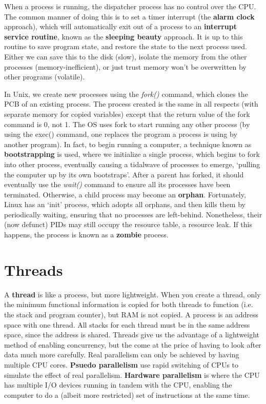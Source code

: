 When a process is running, the dispatcher process has no control over the CPU. The common manner of doing this is to set a timer interrupt (the {\bf alarm clock} approach), which will automatically exit out of a process to an {\bf interrupt service routine}, known as the {\bf sleeping beauty} approach. It is up to this routine to save program state, and restore the state to the next process used. Either we can save this to the disk (slow), isolate the memory from the other processes (memory-inefficient), or just trust memory won't be overwritten by other programs (volatile).

In Unix, we create new processes using the {\it fork()} command, which clones the PCB of an existing process. The process created is the same in all respects (with separate memory for copied variables) except that the return value of the fork command is 0, not 1. The OS uses fork to start running any other process (by using the exec() command, one replaces the program a process is using by another program). In fact, to begin running a computer, a technique known as {\bf bootstrapping} is used, where we initialize a single process, which begins to fork into other process, eventually causing a tidalwave of processes to emerge, `pulling the computer up by its own bootstraps'. After a parent has forked, it should eventually use the {\it wait()} command to ensure all its processes have been terminated. Otherwise, a child process may become an {\bf orphan}. Fortunately, Linux has an `init' process, which adopts all orphans, and then kills them by periodically waiting, ensuring that no processes are left-behind. Nonetheless, their (now defunct) PIDs may still occupy the resource table, a resource leak. If this happens, the process is known as a {\bf zombie} process.

\section{Threads}

A {\bf thread} is like a process, but more lightweight. When you create a thread, only the minimum functional information is copied for both threads to function (i.e. the stack and program counter), but RAM is not copied. A process is an address space with one thread. All stacks for each thread must be in the same address space, since the address is shared. Threads give us the advantage of a lightweight method of enabling concurrency, but the come at the price of having to look after data much more carefully. Real parallelism can only be achieved by having multiple CPU cores. {\bf Psuedo parallelism} use rapid switching of CPUs to simulate the effect of real parallelism. {\bf Hardware parallelism} is where the CPU has multiple I/O devices running in tandem with the CPU, enabling the computer to do a (albeit more restricted) set of instructions at the same time.

